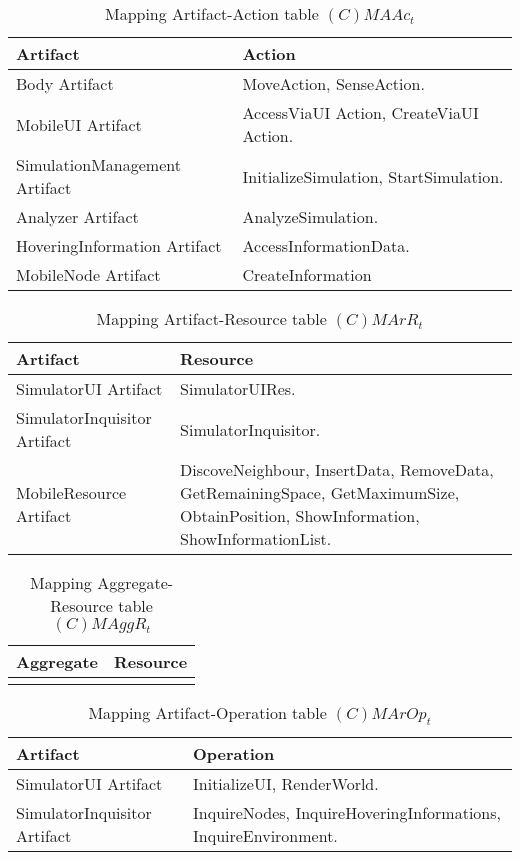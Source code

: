 \begin{table}[H]
	\centering
	\begin{tabular}{|p{4cm}|p{8cm}|}
			\hline
			\textbf{Artifact} & \textbf{Action} \\
			\hline
			Body Artifact & MoveAction, SenseAction. \\
			\hline
			MobileUI Artifact & AccessViaUI Action, CreateViaUI Action. \\
			\hline
			SimulationManagement Artifact & InitializeSimulation, StartSimulation. \\
			\hline
			Analyzer Artifact & AnalyzeSimulation. \\
			\hline
			HoveringInformation Artifact & AccessInformationData. \\
			\hline
			MobileNode Artifact & CreateInformation \\
			\hline
		\end{tabular}
	\caption{Mapping Artifact-Action table $(C)MAAc_t$}
	\label{tab:cmaact}
\end{table}

\begin{table}[H]
	\centering
	\begin{tabular}{|p{4cm}|p{8cm}|}
			\hline
			\textbf{Artifact} & \textbf{Resource} \\
			\hline
			SimulatorUI Artifact & SimulatorUIRes. \\
			\hline
			SimulatorInquisitor Artifact & SimulatorInquisitor. \\
			\hline
			MobileResource Artifact & DiscoveNeighbour, InsertData, RemoveData,
			GetRemainingSpace, GetMaximumSize, ObtainPosition, ShowInformation,
			ShowInformationList. \\
			\hline
		\end{tabular}
	\caption{Mapping Artifact-Resource table $(C)MArR_t$}
	\label{tab:cmarrt}
\end{table}

\begin{table}[H]
	\centering
	\begin{tabular}{|p{4cm}|p{8cm}|}
			\hline
			\textbf{Aggregate} & \textbf{Resource} \\
			\hline
			& \\
			\hline
		\end{tabular}
	\caption{Mapping Aggregate-Resource table $(C)MAggR_t$}
	\label{tab:cmaggrt}
\end{table}

\begin{table}[H]
	\centering
	\begin{tabular}{|p{4cm}|p{8cm}|}
			\hline
			\textbf{Artifact} & \textbf{Operation} \\
			\hline
			SimulatorUI Artifact & InitializeUI, RenderWorld. \\
			\hline
			SimulatorInquisitor Artifact & InquireNodes, InquireHoveringInformations,
			InquireEnvironment. \\
			\hline
		\end{tabular}
	\caption{Mapping Artifact-Operation table $(C)MArOp_t$}
	\label{tab:cmaropt}
\end{table}

